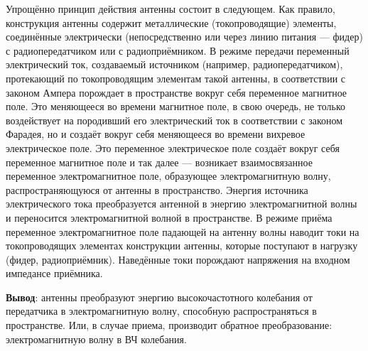 Упрощённо принцип действия антенны состоит в следующем. Как правило, конструкция антенны содержит металлические (токопроводящие) элементы, соединённые электрически (непосредственно или через линию питания — фидер) с радиопередатчиком или с радиоприёмником. В режиме передачи переменный электрический ток, создаваемый источником (например, радиопередатчиком), протекающий по токопроводящим элементам такой антенны, в соответствии с законом Ампера порождает в пространстве вокруг себя переменное магнитное поле. Это меняющееся во времени магнитное поле, в свою очередь, не только воздействует на породивший его электрический ток в соответствии с законом Фарадея, но и создаёт вокруг себя меняющееся во времени вихревое электрическое поле. Это переменное электрическое поле создаёт вокруг себя переменное магнитное поле и так далее — возникает взаимосвязанное переменное электромагнитное поле, образующее электромагнитную волну, распространяющуюся от антенны в пространство. Энергия источника электрического тока преобразуется антенной в энергию электромагнитной волны и переносится электромагнитной волной в пространстве. В режиме приёма переменное электромагнитное поле падающей на антенну волны наводит токи на токопроводящих элементах конструкции антенны, которые поступают в нагрузку (фидер, радиоприёмник). Наведённые токи порождают напряжения на входном импедансе приёмника.


\textbf{Вывод}: антенны преобразуют энергию высокочастотного колебания от передатчика в электромагнитную волну, способную распространяться в пространстве. Или, в случае приема, производит обратное преобразование: электромагнитную волну в ВЧ колебания.
